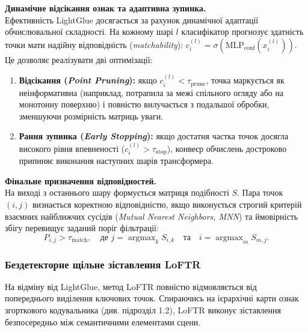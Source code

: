 \documentclass[a4paper, 12pt, titlepage]{article}
\DeclareMathOperator*{\argmax}{argmax}
\begin{document}
\textbf{Динамічне відсікання ознак та адаптивна зупинка.}\\
Ефективність LightGlue досягається за рахунок динамічної адаптації обчислювальної складності. На кожному шарі $l$ класифікатор прогнозує здатність точки мати надійну відповідність (\textit{matchability}): $c_i^{(l)} = \sigma( \text{MLP}_{\text{conf}}( x_i^{(l)} ) )$. Це дозволяє реалізувати дві оптимізації:
\begin{enumerate}
    \item \textbf{Відсікання (\textit{Point Pruning}):} якщо $c_i^{(l)} < \tau_{\text{prune}}$, точка маркується як неінформативна (наприклад, потрапила за межі спільного огляду або на монотонну поверхню) і повністю вилучається з подальшої обробки, зменшуючи розмірність матриць уваги.
    \item \textbf{Рання зупинка (\textit{Early Stopping}):} якщо достатня частка точок досягла високого рівня впевненості ($c_i^{(l)} > \tau_{\text{stop}}$), конвеєр обчислень достроково припиняє виконання наступних шарів трансформера.
\end{enumerate}

\textbf{Фінальне призначення відповідностей.}\\
На виході з останнього шару формується матриця подібності $S$. Пара точок $(i, j)$ визнається коректною відповідністю, якщо виконується строгий критерій взаємних найближчих сусідів (\textit{Mutual Nearest Neighbors, MNN}) та ймовірність збігу перевищує заданий поріг фільтрації:
\begin{equation}
P_{i,j} > \tau_{\text{match}}, \quad \text{де } j = \argmax_{k} S_{i,k} \quad \text{та} \quad i = \argmax_{m} S_{m,j}.
\end{equation}

\subsubsection{Бездетекторне щільне зіставлення LoFTR}
На відміну від LightGlue, метод LoFTR \cite{loftr} повністю відмовляється від попереднього виділення ключових точок. Спираючись на ієрархічні карти ознак згорткового кодувальника (див. підрозділ 1.2), LoFTR виконує зіставлення безпосередньо між семантичними елементами сцени.
\end{document}
